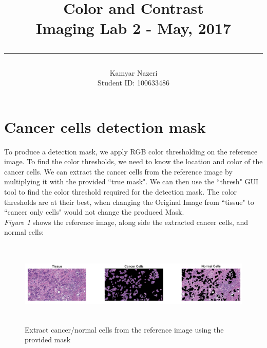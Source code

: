 \documentclass[a4paper,11pt]{article}
\begin{document}
\title{
	\Huge \textbf {Color and Contrast}
    \\ [0.2cm]
	\LARGE Imaging Lab 2 - May, 2017
    \\ [0.5cm]
    \hrule
}

\date{}

\author{
		\Large Kamyar Nazeri \\
		\large Student ID: 100633486 }

\maketitle
\newpage

\section*{Cancer cells detection mask}
To produce a detection mask, we apply RGB color thresholding on the reference image. To find the color thresholds, we need to know the location and color of the cancer cells. We can extract the cancer cells from the reference image by multiplying it with the provided ``true mask". We can then use the ``thresh" GUI tool to find the color threshold required for the detection mask. The color thresholds are at their best, when changing the Original Image from ``tissue" to ``cancer only cells" would not change the produced Mask. \\
\emph{Figure 1} shows the reference image, along side the extracted cancer cells, and normal cells:

\begin{figure}[!htb]
  \centering
  \includegraphics[width=16cm, height=4cm]{1.png}
  \caption{\small Extract cancer/normal cells from the reference image using the provided mask}
\end{figure}
\end{document}
